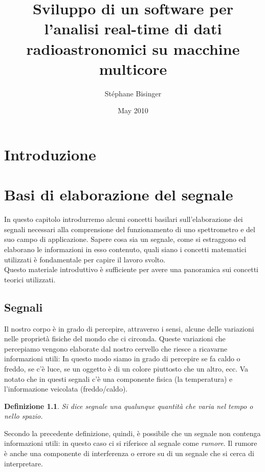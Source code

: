 \documentclass[a4paper,11pt,twoside,openright]{unibo}
\newtheorem{definitions}{Definizione}[chapter]
\begin{document}
\title{Sviluppo di un software per l'analisi real-time di dati
radioastronomici su macchine multicore}
\author{St\'ephane Bisinger}
\date{May 2010}

\maketitle
%

\tableofcontents

\chapter*{Introduzione}
\label{intro}
\chapter{Basi di elaborazione del segnale}
\label{math_bkg}
In questo capitolo introdurremo alcuni concetti basilari sull'elaborazione dei
segnali necessari alla comprensione del funzionamento di uno
spettrometro e del suo campo di applicazione. Sapere cosa sia un segnale, come
si estraggono ed elaborano le informazioni in esso contenuto, quali siano i
concetti matematici utilizzati \`e fondamentale per capire il lavoro svolto.\\
Questo materiale introduttivo \`e sufficiente per avere una panoramica sui
concetti teorici utilizzati.

\section{Segnali}
Il nostro corpo \`e in grado di percepire, attraverso i sensi, alcune delle
variazioni nelle propriet\`a fisiche del mondo che ci circonda. Queste variazioni che percepiamo vengono
elaborate dal nostro cervello che riesce a ricavarne informazioni utili: In questo modo
siamo in grado di percepire se fa caldo o freddo, se c'\`e luce, se un oggetto
\`e di un colore piuttosto che un altro, ecc. Va notato che in questi segnali
c'\`e una componente fisica (la temperatura) e l'informazione veicolata
(freddo/caldo). \cite{bertoni}
\begin{definitions} \label{def:signal}
Si dice segnale una qualunque quantit\`a che varia nel tempo o nello spazio.
\end{definitions}
Secondo la precedente definizione, quindi, \`e possibile che un segnale non
contenga informazioni utili: in questo caso ci si riferisce al segnale come
\emph{rumore}. Il rumore \`e anche una componente di interferenza o errore su di
un segnale che si cerca di interpretare.
\end{document}
